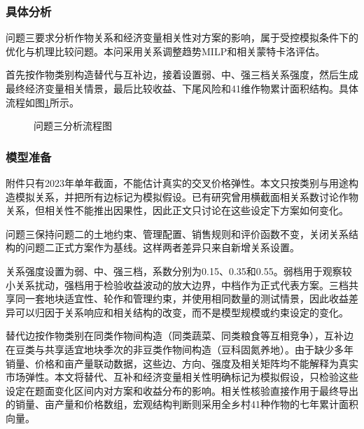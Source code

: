 \subsubsection{具体分析}

问题三要求分析作物关系和经济变量相关性对方案的影响，属于受控模拟条件下的优化与机理比较问题。本问采用关系调整趋势MILP和相关蒙特卡洛评估。

首先按作物类别构造替代与互补边，接着设置弱、中、强三档关系强度，然后生成最终经济变量相关情景，最后比较收益、下尾风险和41维作物累计面积结构。具体流程如图\ref{fig:analysis3_flow}所示。

\begin{figure}[H]
  \begin{center}
    \caption{问题三分析流程图}
    \label{fig:analysis3_flow}
  \end{center}
\end{figure}

\subsubsection{模型准备}

附件只有2023年单年截面，不能估计真实的交叉价格弹性。本文只按类别与用途构造模拟关系，并把所有边标记为模拟假设。已有研究曾用横截面相关系数讨论作物关系，但相关性不能推出因果性，因此正文只讨论在这些设定下方案如何变化。

问题三保持问题二的土地约束、管理配置、销售规则和评价函数不变，关闭关系结构的问题二正式方案作为基线。这样两者差异只来自新增关系设置。

关系强度设置为弱、中、强三档，系数分别为0.15、0.35和0.55。弱档用于观察较小关系扰动，强档用于检验收益波动的放大边界，中档作为正式代表方案。三档共享同一套地块适宜性、轮作和管理约束，并使用相同数量的测试情景，因此收益差异可以归因于关系响应和相关结构的改变，而不是模型规模或约束设定的变化。

替代边按作物类别在同类作物间构造（同类蔬菜、同类粮食等互相竞争），互补边在豆类与共享适宜地块季次的非豆类作物间构造（豆科固氮养地）。由于缺少多年销量、价格和亩产量联动数据，这些边、方向、强度及相关矩阵均不能解释为真实市场弹性。本文将替代、互补和经济变量相关性明确标记为模拟假设，只检验这些设定在题面变化区间内对方案和收益分布的影响。相关性核验直接作用于最终导出的销量、亩产量和价格数组，宏观结构判断则采用全乡村41种作物的七年累计面积向量。
